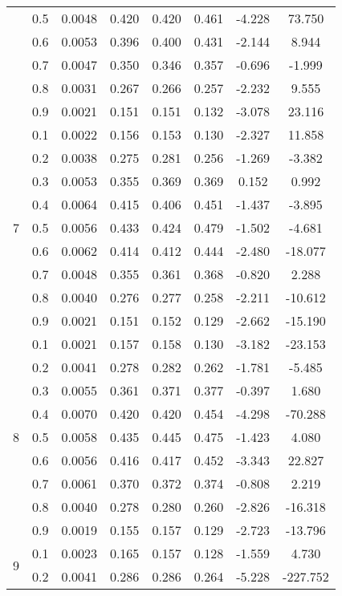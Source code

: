 \documentclass[11pt,a4paper]{report}
\begin{document}
\begin{longtable}{ | c | c || c | c | c | c | c | c | }
 & 0.5 & 0.0048 & 0.420 & 0.420 & 0.461 & -4.228 & 73.750 \\
 & 0.6 & 0.0053 & 0.396 & 0.400 & 0.431 & -2.144 & 8.944 \\
 & 0.7 & 0.0047 & 0.350 & 0.346 & 0.357 & -0.696 & -1.999 \\
 & 0.8 & 0.0031 & 0.267 & 0.266 & 0.257 & -2.232 & 9.555 \\
 & 0.9 & 0.0021 & 0.151 & 0.151 & 0.132 & -3.078 & 23.116 \\
 \hline
\multirow{9}{*}{7} & 0.1 & 0.0022 & 0.156 & 0.153 & 0.130 & -2.327 & 11.858 \\
 & 0.2 & 0.0038 & 0.275 & 0.281 & 0.256 & -1.269 & -3.382 \\
 & 0.3 & 0.0053 & 0.355 & 0.369 & 0.369 & 0.152 & 0.992 \\
 & 0.4 & 0.0064 & 0.415 & 0.406 & 0.451 & -1.437 & -3.895 \\
 & 0.5 & 0.0056 & 0.433 & 0.424 & 0.479 & -1.502 & -4.681 \\
 & 0.6 & 0.0062 & 0.414 & 0.412 & 0.444 & -2.480 & -18.077 \\
 & 0.7 & 0.0048 & 0.355 & 0.361 & 0.368 & -0.820 & 2.288 \\
 & 0.8 & 0.0040 & 0.276 & 0.277 & 0.258 & -2.211 & -10.612 \\
 & 0.9 & 0.0021 & 0.151 & 0.152 & 0.129 & -2.662 & -15.190 \\
 \hline
\multirow{9}{*}{8} & 0.1 & 0.0021 & 0.157 & 0.158 & 0.130 & -3.182 & -23.153 \\
 & 0.2 & 0.0041 & 0.278 & 0.282 & 0.262 & -1.781 & -5.485 \\
 & 0.3 & 0.0055 & 0.361 & 0.371 & 0.377 & -0.397 & 1.680 \\
 & 0.4 & 0.0070 & 0.420 & 0.420 & 0.454 & -4.298 & -70.288 \\
 & 0.5 & 0.0058 & 0.435 & 0.445 & 0.475 & -1.423 & 4.080 \\
 & 0.6 & 0.0056 & 0.416 & 0.417 & 0.452 & -3.343 & 22.827 \\
 & 0.7 & 0.0061 & 0.370 & 0.372 & 0.374 & -0.808 & 2.219 \\
 & 0.8 & 0.0040 & 0.278 & 0.280 & 0.260 & -2.826 & -16.318 \\
 & 0.9 & 0.0019 & 0.155 & 0.157 & 0.129 & -2.723 & -13.796 \\
 \hline
\multirow{9}{*}{9} & 0.1 & 0.0023 & 0.165 & 0.157 & 0.128 & -1.559 & 4.730 \\
 & 0.2 & 0.0041 & 0.286 & 0.286 & 0.264 & -5.228 & -227.752 \\

\end{longtable}
\end{document}
